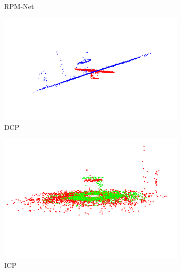 \documentclass[12pt,titlepage, twoside]{article}
\begin{document}
\begin{figure}[htb]
\begin{subfigure}{0.19\textwidth}
      \caption{RPM-Net}
      \label{fig:registration:compare:5}
    \end{subfigure}

\medskip
\begin{subfigure}{0.19\textwidth}
  \includegraphics[width=\linewidth]{./Images/registration_dcp_banana.png}
  \caption{DCP}
  \label{fig:registration:compare:6}
\end{subfigure}\hfil 
\begin{subfigure}{0.19\textwidth}
  \includegraphics[width=\linewidth]{./Images/registration_icp_banana.png}
  \caption{ICP}
  \label{fig:registration:compare:7}
\end{subfigure}\hfil 
\begin{subfigure}{0.19\textwidth}

\end{subfigure}
\end{figure}
\end{document}
